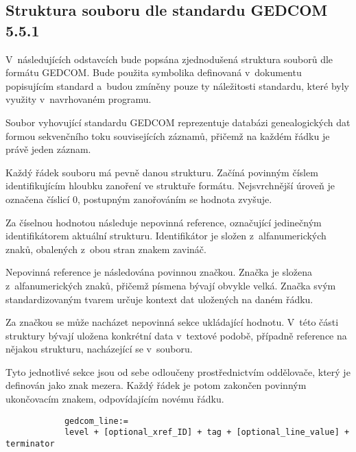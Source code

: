 		\subsection*{Struktura souboru dle standardu GEDCOM 5.5.1}
		V~následujících odstavcích bude popsána zjednodušená struktura souborů dle formátu GEDCOM. Bude použita symbolika definovaná v~dokumentu~\cite{bib:Gedcom551Spec} popisujícím standard a~budou zmíněny pouze ty náležitosti standardu, které byly využity v~navrhovaném programu. \par
		Soubor vyhovující standardu GEDCOM reprezentuje databázi genealogických dat formou sekvenčního toku souvisejících záznamů, přičemž na každém řádku je právě jeden záznam. \par
		Každý řádek souboru má pevně danou strukturu. Začíná povinným číslem identifikujícím hloubku zanoření ve struktuře formátu. Nejsvrchnější úroveň je označena číslicí 0, postupným zanořováním se hodnota zvyšuje. \par
		Za číselnou hodnotou následuje nepovinná reference, označující jedinečným identifikátorem aktuální strukturu. Identifikátor je složen z~alfanumerických znaků, obalených z~obou stran znakem zavináč. \par
		Nepovinná reference je následována povinnou značkou. Značka je složena z~alfanumerických znaků, přičemž písmena bývají obvykle velká. Značka svým standardizovaným tvarem určuje kontext dat uložených na daném řádku. \par
		Za značkou se může nacházet nepovinná sekce ukládající hodnotu. V~této části struktury bývají uložena konkrétní data v~textové podobě, případně reference na nějakou strukturu, nacházející se v~souboru. \par
		Tyto jednotlivé sekce jsou od sebe odloučeny prostřednictvím oddělovače, který je definován jako znak mezera. Každý řádek je potom zakončen povinným ukončovacím znakem, odpovídajícím novému řádku. \par
		
		\begin{verbatim}
			gedcom_line:= 
			level + [optional_xref_ID] + tag + [optional_line_value] + terminator
		\end{verbatim}
		
